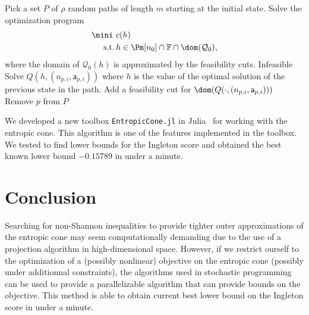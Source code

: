 \documentclass[12pt]{article}
\begin{document}
\begin{algorithm}[!ht]
  \caption{Approximate minimization of $c(h)$ subject to $x \in \Ec \cap \mathbb{F}$ for parameters $\nmax, K, m, \rho$.}
  \label{algo:Ec}
  \begin{algorithmic}
    \STATE Pick a set $P$ of $\rho$ random paths of length $m$ starting at the initial state.
    \STATE Solve the optimization program
    \begin{align*}
      \mini\,\, & c(h)\\
      \text{s.t.} \,& h \in \Pm[n_0] \cap \mathbb{F} \cap \dom(\mathcal{Q}_0),
    \end{align*}
    where the domain of $\mathcal{Q}_0(h)$ is approximated by the feasibility cuts.
    \RETURN Infeasible
    \ENDIF
    \STATE Solve $Q(h, (n_{p,i}, \mathsf{a}_{p,i}))$ where $h$ is the value of the optimal solution of the previous state in the path.
    \STATE Add a feasibility cut for $\dom(Q(\cdot, (n_{p,i}, \mathsf{a}_{p,i})))$
    \STATE Remove $p$ from $P$
    \ENDIF
    \ENDFOR
    \ENDFOR
    \ENDFOR
  \end{algorithmic}
\end{algorithm}

We developed a new toolbox \verb+EntropicCone.jl+ in Julia~\cite{bezanson2012julia} for working with the entropic cone.
This algorithm is one of the features implemented in the toolbox.
We tested  to find lower bounds for the Ingleton score and obtained the best known lower bound $-0.15789$ in under a minute.

\section{Conclusion}
Searching for non-Shannon inequalities to provide tighter outer approximations
of the entropic cone may seem computationally demanding due to the use of a projection algorithm in high-dimensional space.
However, if we restrict ourself to the optimization of a (possibly nonlinear) objective
on the entropic cone (possibly under additionnal constraints),
the algorithms used in stochastic programming can be used to provide a parallelizable
algorithm that can provide bounds on the objective.%
This method is able to obtain current best lower bound on the Ingleton score in under a minute.



\end{document}
